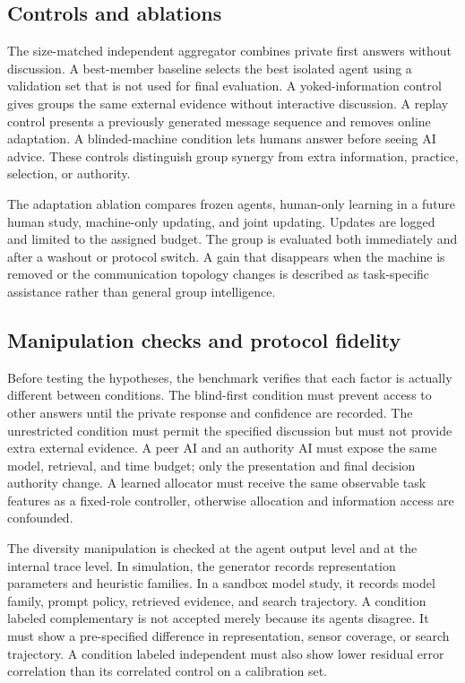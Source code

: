 \documentclass[conference]{IEEEtran}
\begin{document}
\subsection{Controls and ablations}

The size-matched independent aggregator combines private first answers without discussion. A best-member baseline selects the best isolated agent using a validation set that is not used for final evaluation. A yoked-information control gives groups the same external evidence without interactive discussion. A replay control presents a previously generated message sequence and removes online adaptation. A blinded-machine condition lets humans answer before seeing AI advice. These controls distinguish group synergy from extra information, practice, selection, or authority.

The adaptation ablation compares frozen agents, human-only learning in a future human study, machine-only updating, and joint updating. Updates are logged and limited to the assigned budget. The group is evaluated both immediately and after a washout or protocol switch. A gain that disappears when the machine is removed or the communication topology changes is described as task-specific assistance rather than general group intelligence.

\subsection{Manipulation checks and protocol fidelity}

Before testing the hypotheses, the benchmark verifies that each factor is actually different between conditions. The blind-first condition must prevent access to other answers until the private response and confidence are recorded. The unrestricted condition must permit the specified discussion but must not provide extra external evidence. A peer AI and an authority AI must expose the same model, retrieval, and time budget; only the presentation and final decision authority change. A learned allocator must receive the same observable task features as a fixed-role controller, otherwise allocation and information access are confounded.

The diversity manipulation is checked at the agent output level and at the internal trace level. In simulation, the generator records representation parameters and heuristic families. In a sandbox model study, it records model family, prompt policy, retrieved evidence, and search trajectory. A condition labeled complementary is not accepted merely because its agents disagree. It must show a pre-specified difference in representation, sensor coverage, or search trajectory. A condition labeled independent must also show lower residual error correlation than its correlated control on a calibration set.
\end{document}
